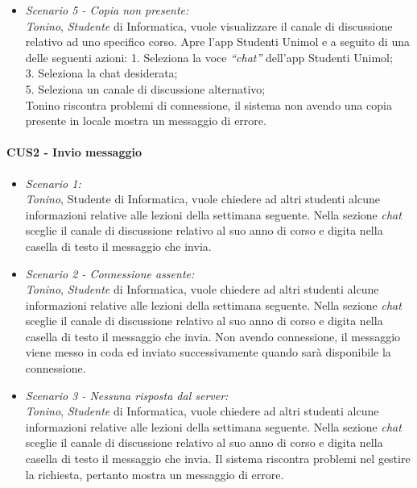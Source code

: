 \begin{itemize}
\item \textit{Scenario 5 - Copia non presente:\\}
\textit{Tonino}, \textit{Studente} di Informatica, vuole visualizzare il canale di discussione relativo ad uno specifico corso. Apre l’app Studenti Unimol e a seguito di una delle seguenti azioni:
1. Seleziona la voce \textit{“chat”} dell’app Studenti Unimol;\\
3. Seleziona la chat desiderata;\\
5. Seleziona un canale di discussione alternativo;\\
Tonino riscontra problemi di connessione, il sistema non avendo una copia presente in locale mostra un messaggio di errore.\\
\end{itemize}


\paragraph{CUS2 - Invio messaggio\\}
\begin{itemize}

\item \textit{Scenario 1:\\}
\textit{Tonino}, {Studente} di Informatica, vuole chiedere ad altri studenti alcune informazioni relative alle lezioni della settimana seguente. Nella sezione \textit{chat} sceglie il canale di discussione relativo al suo anno di corso e digita nella casella di testo il messaggio che invia.\\

\item \textit{Scenario 2 - Connessione assente:\\}
\textit{Tonino}, \textit{Studente} di Informatica, vuole chiedere ad altri studenti alcune informazioni relative alle lezioni della settimana seguente. Nella sezione \textit{chat} sceglie il canale di discussione relativo al suo anno di corso e digita nella casella di testo il messaggio che invia. Non avendo connessione, il messaggio viene messo in coda ed inviato successivamente quando sarà disponibile la connessione.\\

\item \textit{Scenario 3 - Nessuna risposta dal server:\\}
\textit{Tonino}, \textit{Studente} di Informatica, vuole chiedere ad altri studenti alcune informazioni relative alle lezioni della settimana seguente. Nella sezione \textit{chat} sceglie il canale di discussione relativo al suo anno di corso e digita nella casella di testo il messaggio che invia. Il sistema riscontra problemi nel gestire la richiesta, pertanto mostra un messaggio di errore.\\
\end{itemize}


